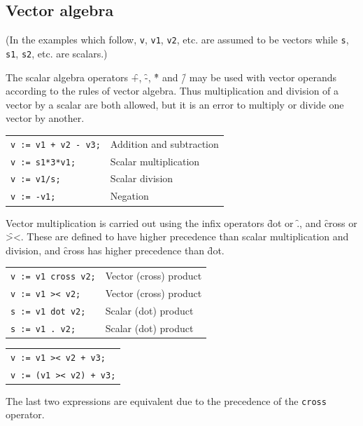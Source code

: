 \subsection{Vector algebra}

(In the examples which follow, \texttt{v}, \texttt{v1}, \texttt{v2}, etc.
are assumed to be vectors while \texttt{s}, \texttt{s1}, \texttt{s2}, etc. are scalars.)

The scalar algebra operators \f{+}, \f{-}, \f{*} and \f{/} may be used
with vector operands according to the rules of vector algebra.  Thus
multiplication and division of a vector by a scalar are both allowed,
but it is an error to multiply or divide one vector by another.

\begin{tabular}{l|l}
\texttt{v := v1 + v2 - v3;} & Addition and subtraction \\
\texttt{v := s1*3*v1;} & Scalar multiplication \\
\texttt{v := v1/s;} & Scalar division \\
\texttt{v := -v1;} & Negation
\end{tabular}

  
\hypertarget{operator:DOT}{}
\hypertarget{operator:CROSS}{}
Vector multiplication is carried out using the infix operators \f{dot}
or \f{.}, and \f{cross} or \f{><}.  These are defined to have higher
precedence than scalar multiplication and division, and \f{cross} has
higher precedence than \f{dot}.

\begin{tabular}{l|l}
\texttt{v := v1 cross v2;} & Vector (cross) product \\
\texttt{v := v1 >< v2;} & Vector (cross) product \\
\texttt{s := v1 dot v2;} & Scalar (dot) product \\
\texttt{s := v1~.~v2;} & Scalar (dot) product
\end{tabular}

\begin{tabular}{l}
\texttt{v := v1 >< v2 + v3;} \\
\texttt{v := (v1 >< v2) + v3;}
\end{tabular}

The last two expressions are equivalent due to the precedence of
the \texttt{cross} operator.

